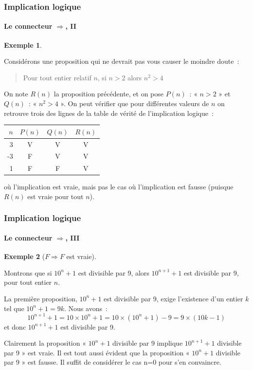 \documentclass[10pt,notheorems]{beamer}
\theoremstyle{plain}
\theoremstyle{definition} %
\newtheorem{example}{Exemple}
\begin{document}
\begin{frame}
  \frametitle{Implication logique}
  \framesubtitle{Le connecteur $\Rightarrow$, II}
  \hypertarget{slide_implication_2}{}

  \begin{example}\label{ex:implication:1}

    Considérons une proposition qui ne devrait pas vous causer le
    moindre doute~:

    \medskip

    \begin{quotation}
      {Pour tout entier relatif $n$, si $n>2$ alors $n^2>4$}
    \end{quotation}

    \medskip

    On note $R(n)$ la proposition précédente, et on pose $P(n)$~: «
    $n>2$ » et $Q(n)$~: « $n^2>4$ ». On peut vérifier que pour
    différentes valeurs de $n$ on retrouve trois des lignes de
    la table de vérité de l'implication logique~:
    \begin{table}[H]
      \centering
      \begin{tabular}[H]{|r|cc|c|}
        \hline
        $n$ & $P(n)$ & $Q(n)$ & $R(n)$\\ \hline
        3 & V & V & V\\
        -3 & F & V & V\\
        1 & F & F & V\\
        \hline\hline
      \end{tabular}
    \end{table}
    où l'implication est vraie, mais pas le cas où l'implication est
    fausse (puisque $R(n)$ est vraie pour tout $n$).
  \end{example}

\end{frame}


\begin{frame}
  \frametitle{Implication logique}
  \framesubtitle{Le connecteur $\Rightarrow$, III}
  \hypertarget{slide_implication_3}{}

  \begin{example}[$F\Rightarrow F$ est vraie]\label{ex:implication:2}

    Montrons que si $10^n+1$ est divisible par 9, alors $10^{n+1}+1$
    est divisible par 9, pour tout entier $n$.\newline

    La première proposition, $10^n+1$ est divisible par 9, exige
    l'existence d'un entier $k$ tel que $10^n+1 = 9k$. Nous avons~:
    \[
      10^{n+1}+1 = 10\times 10^n+1 =
      10\times(10^{n}+1)-9=9\times(10k-1)
    \]
    et donc $10^{n+1}+1$ est divisible par 9.\newline

    Clairement la proposition « $10^n+1$ divisible par 9 implique
    $10^{n+1}+1$ divisible par 9 » est vraie. Il est tout aussi
    évident que la proposition « $10^n+1$ divisible par 9 » est
    fausse. Il suffit de considérer le cas n=0 pour s'en convaincre.
  \end{example}

\end{frame}
\end{document}
